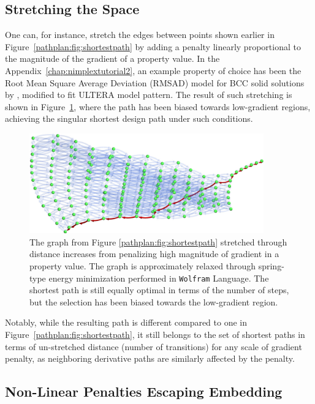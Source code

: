 \subsection{Stretching the Space} \label{pathplan:ssec:gradientstretch}

One can, for instance, stretch the edges between points shown earlier in Figure~\ref{pathplan:fig:shortestpath} by adding a penalty linearly proportional to the magnitude of the gradient of a property value. In the Appendix~\ref{chap:nimplextutorial2}, an example property of choice has been the Root Mean Square Average Deviation (RMSAD) model for BCC solid solutions by \citet{Tandoc2023MiningAlloys}, modified to fit ULTERA model pattern. The result of such stretching is shown in Figure~\ref{pathplan:fig:lowgradient}, where the path has been biased towards low-gradient regions, achieving the singular shortest design path under such conditions. 

\begin{figure}[H]
    \centering
    \includegraphics[width=0.9\textwidth]{pathplanning/InfeasibilityGliding_LowGradient.jpeg}
    \caption{The graph from Figure \ref{pathplan:fig:shortestpath} stretched through distance increases from penalizing high magnitude of gradient in a property value. The graph is approximately relaxed through spring-type energy minimization performed in \texttt{Wolfram} Language. The shortest path is still equally optimal in terms of the number of steps, but the selection has been biased towards the low-gradient region.}
    \label{pathplan:fig:lowgradient}
\end{figure}

Notably, while the resulting path is different compared to one in Figure~\ref{pathplan:fig:shortestpath}, it still belongs to the set of shortest paths in terms of un-stretched distance (number of transitions) for any scale of gradient penalty, as neighboring derivative paths are similarly affected by the penalty.

\subsection{Non-Linear Penalties Escaping Embedding} \label{pathplan:ssec:gradientsquare}

